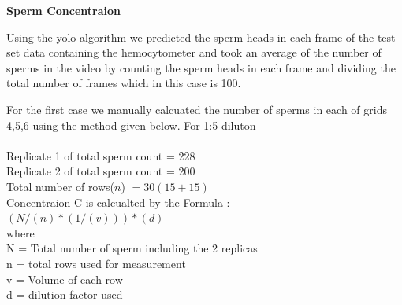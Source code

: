 \documentclass{article}
\begin{document}
\textbf{Sperm Concentraion}

Using the yolo algorithm we predicted the sperm heads in each frame of the test set data containing the hemocytometer and took an average of the number of sperms in the video by counting the sperm heads in each frame and dividing the 
total number of frames which in this case is 100.


For the first case we manually calcuated the number of sperms in each of grids 4,5,6 using the method given below.
For 1:5 diluton \\ \\
Replicate 1 of total sperm count  = 228 \\
Replicate 2 of total sperm count  =  200 \\
Total number of rows($n$) $= 30(15 + 15)$ \\ 

Concentraion C is calcualted by the Formula : \\
$(N/(n)*(1/(v)))*(d)$ \\
where \\
N = Total number of sperm including the 2 replicas \\
n = total rows used for measurement \\
v = Volume of each row \\
d = dilution factor used \\
\end{document}

